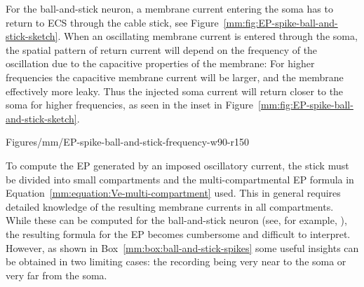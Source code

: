 For the ball-and-stick neuron, a membrane current entering the soma has to return to ECS through the cable
stick, see Figure~\ref{mm:fig:EP-spike-ball-and-stick-sketch}.
When an oscillating membrane current is entered through the soma, the spatial pattern of return current will depend on the frequency of the oscillation due to the capacitive properties of the membrane: For higher frequencies the capacitive membrane current will be larger, and the 
membrane effectively more leaky. Thus the injected soma current will return closer to the soma for higher frequencies, 
as  seen in the inset in Figure~\ref{mm:fig:EP-spike-ball-and-stick-sketch}.  


\begin{cnfigure}{Figures/mm/EP-spike-ball-and-stick-frequency-w90-r150}
\caption[]{(a) Action potential used in simulations in Figure~\ref{mm:fig:EP-spike-ball-and-stick-results}(inset) 
and its frequency content. 
(b) Frequency content of example extracellular spike.
Inset: Typical spike shape computed a distance $r=10~\mu$m
perpendicular to the dendrite at the level of soma for a ball-and-stick 
neuron with diameter $d=2~\mu$m and infinite dendrite length.
Here the intracellular action potential in left panel was imposed as a voltage-clamp in the soma.
The extracellular spike width is defined as the width of the negative phase at 25\% of its maximum
amplitude and is 0.44~ms for the example spike.
The amplitude (peak-to-peak value) of the spike is $56~\mu$V  
}
\label{mm:fig:EP-spike-ball-and-stick-frequency}
\figpermOurs
\end{cnfigure}


To compute the EP generated by an imposed oscillatory current, the stick must be divided into small compartments  
and the multi-compartmental EP formula in Equation~\ref{mm:equation:Ve-multi-compartment} used. 
This in general requires detailed knowledge of the resulting membrane currents in all compartments. 
While these can be computed for the ball-and-stick neuron (see, for example, \citet{Pettersen2014}), 
the resulting formula for the EP becomes cumbersome and difficult to interpret. 
However, as shown in  Box~\ref{mm:box:ball-and-stick-spikes} 
some useful insights can be obtained in two limiting cases: the recording being very near to the soma or very far from the soma.

